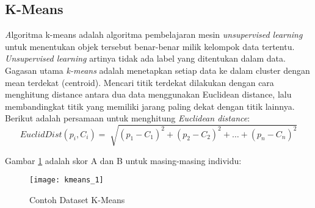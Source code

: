 \subsection{K-Means} 
\label{sec:k_means}
\textit Algoritma {k-means} adalah algoritma pembelajaran mesin \textit{unsupervised learning} untuk menentukan objek tersebut benar-benar milik kelompok data tertentu. \textit{Unsupervised learning} artinya tidak ada label yang ditentukan dalam data. Gagasan utama \textit{k-means} adalah menetapkan setiap data ke dalam cluster dengan mean terdekat (centroid). Mencari titik terdekat dilakukan dengan cara menghitung distance antara dua data menggunakan Euclidean distance, lalu membandingkat titik yang memiliki jarang paling dekat dengan titik lainnya. \\

\noindent Berikut adalah persamaan untuk menghitung \textit{Euclidean distance}:
\begin{equation}
EuclidDist(p_i,C_i) = \sqrt[]{(p_1-C_1)^2+(p_2-C_2)^2+\ldots +(p_n-C_n)^2}
\end{equation}
\vspace{0.2cm}

\noindent Gambar \ref{fig:kmeans_1} adalah skor A dan B untuk masing-masing individu:

\begin{figure}[H]
	\centering
	\texttt{[image: kmeans\_1]}
	\caption{Contoh Dataset K-Means}
	\label{fig:kmeans_1}
\end{figure}

